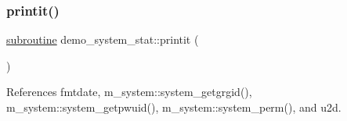\subsubsection{\texorpdfstring{printit()}{printit()}}
{\footnotesize\ttfamily \hyperlink{M__stopwatch_83_8txt_acfbcff50169d691ff02d4a123ed70482}{subroutine} demo\+\_\+system\+\_\+stat\+::printit (\begin{DoxyParamCaption}{ }\end{DoxyParamCaption})}



References fmtdate, m\+\_\+system\+::system\+\_\+getgrgid(), m\+\_\+system\+::system\+\_\+getpwuid(), m\+\_\+system\+::system\+\_\+perm(), and u2d.

